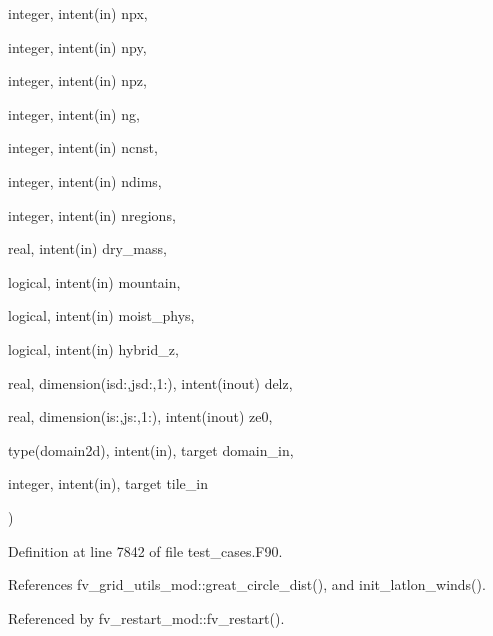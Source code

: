 {\begin{DoxyParamCaption}
\item[{integer, intent(in)}]{npx, }
\item[{integer, intent(in)}]{npy, }
\item[{integer, intent(in)}]{npz, }
\item[{integer, intent(in)}]{ng, }
\item[{integer, intent(in)}]{ncnst, }
\item[{integer, intent(in)}]{ndims, }
\item[{integer, intent(in)}]{nregions, }
\item[{real, intent(in)}]{dry\-\_\-mass, }
\item[{logical, intent(in)}]{mountain, }
\item[{logical, intent(in)}]{moist\-\_\-phys, }
\item[{logical, intent(in)}]{hybrid\-\_\-z, }
\item[{real, dimension(isd\-:,jsd\-:,1\-:), intent(inout)}]{delz, }
\item[{real, dimension(is\-:,js\-:,1\-:), intent(inout)}]{ze0, }
\item[{type(domain2d), intent(in), target}]{domain\-\_\-in, }
\item[{integer, intent(in), target}]{tile\-\_\-in}
\end{DoxyParamCaption}
)}\label{classtest__cases__mod_ac5330b5b0801ece5e8c1af330fa5b56f}


Definition at line 7842 of file test\-\_\-cases.\-F90.



References fv\-\_\-grid\-\_\-utils\-\_\-mod\-::great\-\_\-circle\-\_\-dist(), and init\-\_\-latlon\-\_\-winds().



Referenced by fv\-\_\-restart\-\_\-mod\-::fv\-\_\-restart().

